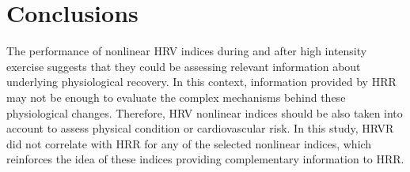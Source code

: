 \section{Conclusions}

The performance of nonlinear HRV indices during and after high intensity exercise suggests that they could be assessing relevant information about underlying physiological recovery. In this context, information provided by HRR may not be enough to evaluate the complex mechanisms behind these physiological changes. Therefore, HRV nonlinear indices should be also taken into account to assess physical condition or cardiovascular risk. In this study, HRVR did not correlate with HRR for any of the selected nonlinear indices, which reinforces the idea of these indices providing complementary information to HRR.